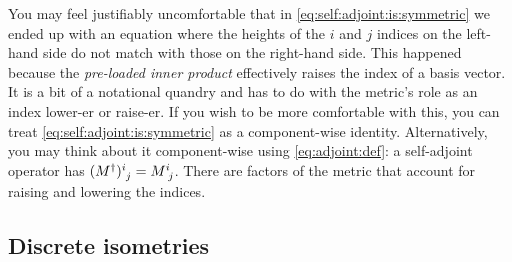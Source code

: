 \documentclass[12pt, oneside]{report}    %
\let\oldsection\section
\def\section{%
  \setcounter{sidenote}{1}%
  \oldsection
}
\begin{document}
You may feel justifiably uncomfortable that in \eqref{eq:self:adjoint:is:symmetric} we ended up with an equation where the heights of the $i$ and $j$ indices on the left-hand side do not match with those on the right-hand side. This happened because the \emph{pre-loaded inner product} effectively raises the index of a basis vector. It is a bit of a notational quandry and has to do with the metric's role as an index lower-er or raise-er. If you wish to be more comfortable with this, you can treat \eqref{eq:self:adjoint:is:symmetric} as a component-wise identity. Alternatively, you may think about it component-wise using \eqref{eq:adjoint:def}: a self-adjoint operator has $(M^\dag)\aij{i}{j} = M\aij{i}{j}$. There are factors of the metric that account for raising and lowering the indices.


\begin{subappendices}

\section{Discrete isometries}
\label{sec:discrete:isometries}


\end{subappendices}
\end{document}
